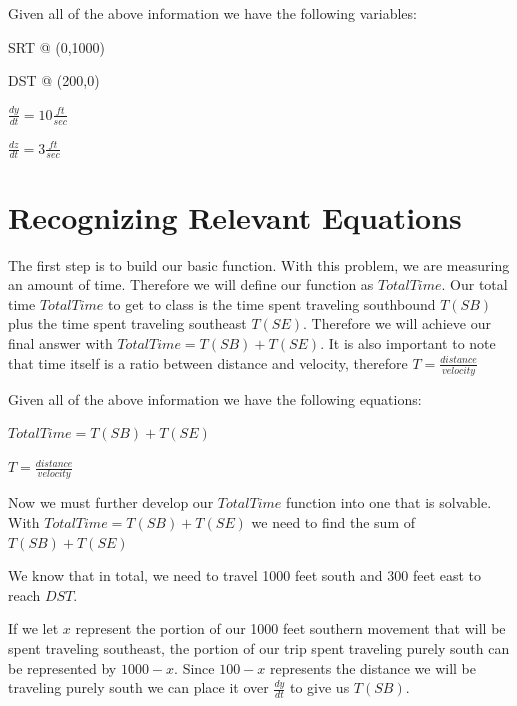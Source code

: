 \documentclass{article}
\begin{document}
\vspace{.5cm}
Given all of the above information we have the following variables:

\vspace{.25cm}
SRT @ (0,1000)

\vspace{.25cm}
DST @ (200,0)

\vspace{.25cm}
$ \frac{dy}{dt} = 10\frac{ft}{sec} $

\vspace{.25cm}
$ \frac{dz}{dt} = 3\frac{ft}{sec} $ 

\section{Recognizing Relevant Equations}

The first step is to build our basic function. With this problem, we are measuring an amount of time. Therefore we will define our function as $ TotalTime $. Our total time $ TotalTime $ to get to class is the time spent traveling southbound $ T(SB) $ plus the time spent traveling southeast $ T(SE) $. Therefore we will achieve our final answer with $ TotalTime = T(SB) + T(SE) $. It is also important to note that time itself is a ratio between distance and velocity, therefore $ T = \frac{distance}{velocity} $

\vspace{.5cm}
Given all of the above information we have the following equations:

\vspace{.25cm}
$ TotalTime = T(SB) + T(SE) $

\vspace{.25cm}
$ T = \frac{distance}{velocity} $

\vspace{.5cm}
Now we must further develop our $ TotalTime $ function into one that is solvable. With $ TotalTime = T(SB) + T(SE) $ we need to find the sum of $ T(SB) + T(SE) $

We know that in total, we need to travel 1000 feet south and 300 feet east to reach $ DST $.

If we let $ x $ represent the portion of our 1000 feet southern movement that will be spent traveling southeast, the portion of our trip spent traveling purely south can be represented by $ 1000 - x $. Since $ 100 - x $ represents the distance we will be traveling purely south we can place it over $ \frac{dy}{dt} $ to give us $ T(SB) $.
\end{document}

